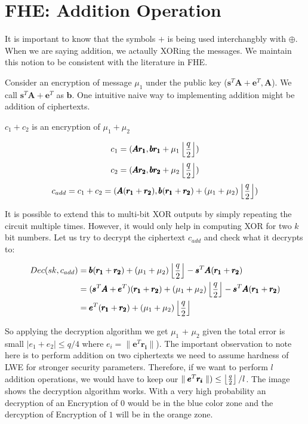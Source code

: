 \documentclass[usletter]{article}
\begin{document}
\section{FHE: Addition Operation}

\begin{remark}
	It is important to know that the symbols $+$ is being used interchangbly with $\oplus$. When we are saying addition, we actaully XORing the messages. We maintain this notion to be consistent with the literature in FHE.
\end{remark}

Consider an encryption of message $\mu_1$ under the public key ($\pmb{s}^{T}\pmb{A} + \pmb{e}^{T}, \pmb{A}$). We call 
$\pmb{s}^{T}\pmb{A} + \pmb{e}^{T}$ as $\pmb{b}$. One intuitive naive way to implementing addition might be addition of ciphertexts.

\begin{claim}
	$c_1 + c_2$ is an encryption of $\mu_1 + \mu_2$
\end{claim}

$$c_1 = ( \pmb{Ar_1}, \pmb{br_1} + \mu_1\left\lfloor \frac{q}{2} \right\rfloor )$$
$$c_2 = ( \pmb{Ar_2}, \pmb{br_2} + \mu_2\left\lfloor \frac{q}{2} \right\rfloor )$$
$$c_{add} = c_1 + c_2 = ( \pmb{A}(\pmb{r_1} + \pmb{r_2}), \pmb{b}(\pmb{r_1} +\pmb{r_2}) + (\mu_1 + \mu_2)\left\lfloor \frac{q}{2} \right\rfloor )$$

It is possible to extend this to multi-bit XOR outputs by simply repeating 
the circuit multiple times. However, it would only help in computing XOR for two $k$ bit numbers. 
Let us try to decrypt the ciphertext $c_{add}$ and check what it decrypts to:

\begin{align*}
Dec(sk,c_{add})
&= \pmb{b}(\pmb{r_1} +\pmb{r_2}) + (\mu_1 + \mu_2)\left\lfloor \frac{q}{2} \right\rfloor-\pmb{s}^T\pmb{A}(\pmb{r_1} + \pmb{r_2})\\
&=(\pmb{s}^{T}\pmb{A} + \pmb{e}^{T})(\pmb{r_1} +\pmb{r_2}) + (\mu_1 + \mu_2)\left\lfloor \frac{q}{2} \right\rfloor-\pmb{s}^T\pmb{A}(\pmb{r_1} + \pmb{r_2})\\
&=\pmb{e}^{T}(\pmb{r_1} +\pmb{r_2}) + (\mu_1 + \mu_2)\left\lfloor \frac{q}{2} \right\rfloor
\end{align*}


So applying the decryption algorithm we get $\mu_1$ + $\mu_2$ given the total error
is small $|e_1 +e_2| \leq q/4$ where $e_i=\parallel\pmb{e}^{T}\pmb{r_i}\parallel$). The important observation to note here is to perform addition on 
two ciphertexts we need to assume hardness of LWE for stronger security parameters. 
Therefore, if we want to perform $l$ addition operations, we would have to keep our $\parallel\pmb{e}^{T}\pmb{r_i}\parallel) \leq \left\lfloor \frac{q}{2} \right\rfloor/l$. The image shows the decryption algorithm works. With a very high probability an decryption of an Encryption of $0$ would be in the blue color zone and the dercyption of Encryption of $1$ will be in the orange zone.
\end{document}
